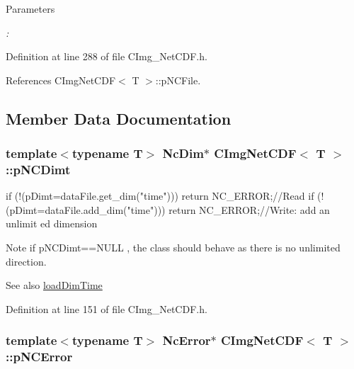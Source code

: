 \begin{DoxyParams}{Parameters}
\item[{\em :}]\end{DoxyParams}

\begin{DoxyCode}
\end{DoxyCode}
 

Definition at line 288 of file CImg\_\-NetCDF.h.

References CImgNetCDF$<$ T $>$::pNCFile.

\subsection{Member Data Documentation}
\hypertarget{classCImgNetCDF_a741b1e75f0973b1057f9e6d0df938bea}{
\subsubsection[{pNCDimt}]{\setlength{\rightskip}{0pt plus 5cm}template$<$typename T$>$ NcDim$\ast$ {\bf CImgNetCDF}$<$ T $>$::{\bf pNCDimt}}}
\label{classCImgNetCDF_a741b1e75f0973b1057f9e6d0df938bea}

\begin{DoxyCode}
   if (!(pDimt=dataFile.get_dim("time"))) return NC_ERROR;//Read
   if (!(pDimt=dataFile.add_dim("time"))) return NC_ERROR;//Write: add an unlimit
      ed dimension
\end{DoxyCode}


\begin{DoxyNote}{Note}
if {\ttfamily pNCDimt==NULL} , the class should behave as there is no unlimited direction.
\end{DoxyNote}
\begin{DoxySeeAlso}{See also}
\hyperlink{classCImgNetCDF_a2ad26dcd306b26255c307e4f6d881240}{loadDimTime} 
\end{DoxySeeAlso}


Definition at line 151 of file CImg\_\-NetCDF.h.\hypertarget{classCImgNetCDF_ab7b0ae4b12b395794e3b0d02225130fd}{
\subsubsection[{pNCError}]{\setlength{\rightskip}{0pt plus 5cm}template$<$typename T$>$ NcError$\ast$ {\bf CImgNetCDF}$<$ T $>$::{\bf pNCError}}}
\label{classCImgNetCDF_ab7b0ae4b12b395794e3b0d02225130fd}


